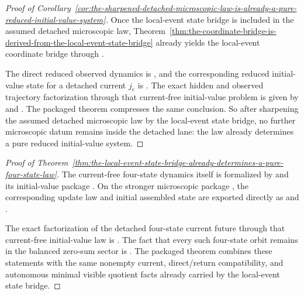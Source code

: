 \begin{proof}[Proof of Corollary~\ref{cor:the-sharpened-detached-microscopic-law-is-already-a-pure-reduced-initial-value-system}]
\label{proof:cor:the-sharpened-detached-microscopic-law-is-already-a-pure-reduced-initial-value-system}
Once the local-event state bridge is included in the assumed detached
microscopic law, Theorem~\ref{thm:the-coordinate-bridge-is-derived-from-the-local-event-state-bridge}
already yields the local-event coordinate bridge through
.

The direct reduced observed dynamics is
, and the
corresponding reduced initial-value state for a detached current \(j_e\) is
. The exact hidden
and observed trajectory factorization through that current-free initial-value
problem is given by
 and
.
The packaged theorem 
compresses the same conclusion. So after sharpening the assumed detached
microscopic law by the local-event state bridge, no further microscopic datum
remains inside the detached lane: the law already determines a pure reduced
initial-value system.
\end{proof}

\begin{proof}[Proof of Theorem~\ref{thm:the-local-event-state-bridge-already-determines-a-pure-four-state-law}]
\label{proof:thm:the-local-event-state-bridge-already-determines-a-pure-four-state-law}
The current-free four-state dynamics itself is formalized by
 and its initial-value package
. On the stronger microscopic package
, the corresponding update law and
initial assembled state are exported directly as
 and
.

The exact factorization of the detached four-state current future through that
current-free initial-value law is
. The
fact that every such four-state orbit remains in the balanced zero-sum sector
is
. The
packaged theorem 
combines these statements with the same nonempty current, direct/return
compatibility, and autonomous minimal visible quotient facts already carried by
the local-event state bridge.
\end{proof}

